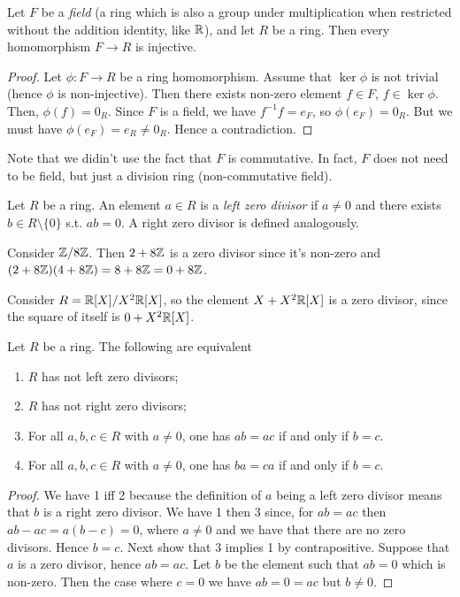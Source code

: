 \begin{theorem}
  Let $F$ be a \emph{field} (a ring which is also a group under multiplication when
  restricted without the addition identity, like $\mathbb R$), and let $R$ be a ring. Then every
  homomorphism $F\to R$ is injective.
\end{theorem}
\begin{proof}
  Let $\phi:F\to R$ be a ring homomorphism. Assume that $\ker\phi$ is not trivial (hence
  $\phi$ is non-injective). Then there exists non-zero element $f\in F$, $f\in\ker \phi$.
  Then, $\phi(f)=0_R$. Since $F$ is a field, we have $f^{-1}f=e_F$, so
  $\phi(e_F)=0_R$. But we must have $\phi(e_F)=e_R\neq 0_R$. Hence a contradiction.
\end{proof}
\begin{remark}
  Note that we didin't use the fact that $F$ is commutative. In fact, $F$ does not need to
  be field, but just a division ring (non-commutative field).
\end{remark}

\begin{definition}
  Let $R$ be a ring. An element $a\in R$ is a \emph{left zero divisor} if $a\neq 0$ and
  there exists $b\in R\setminus \{0\}$ s.t. $ab=0$. A right zero divisor is defined
  analogously.
\end{definition}

\begin{example}
  Consider $\mathbb Z/8\mathbb Z$. Then $2+8\mathbb Z$ is a zero divisor since it's non-zero and
  $(2+8\mathbb Z)(4+8\mathbb Z)=8+8\mathbb Z=0+8\mathbb Z$. 

  Consider $R=\mathbb R[X]/X^2\mathbb R[X]$, so the element $X+X^2\mathbb R[X]$ is a zero divisor, since
  the square of itself is $0+X^2\mathbb R[X]$.
\end{example}


\begin{theorem}
  Let $R$ be a ring. The following are equivalent
  \begin{enumerate}
    \item $R$ has not left zero divisors;
    \item $R$ has not right zero divisors;
    \item For all $a,b,c\in R$ with $a\neq 0$, one has $ab=ac$ if and only if $b=c$.
    \item For all $a,b,c\in R$ with $a\neq 0$, one has $ba=ca$ if and only if $b=c$.
  \end{enumerate}
  \label{<+label+>}
\end{theorem}
\begin{proof}
  We have 1 iff 2 because the definition of $a$ being a left zero divisor means that $b$
  is a right zero divisor.  We have 1 then 3 since, for $ab=ac$ then $ab-ac=a(b-c)=0$,
  where $a\neq 0$ and we have that there are no zero divisors. Hence $b=c$.
  Next show that 3 implies 1 by contrapositive. Suppose that $a$ is a zero divisor, hence
  $ab=ac$. Let $b$ be the element such that $ab=0$ which is non-zero. Then the case where
  $c=0$ we have $ab=0=ac$ but $b\neq 0$. 
\end{proof}

